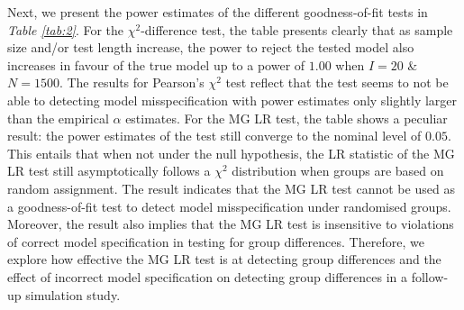 \documentclass[Royal,sageapa,times,doublespace]{sagej}
\begin{document}
\indent Next, we present the power estimates of the different goodness-of-fit tests in \textit{Table \ref{tab:2}}. For the $\chi^2$-difference test, the table presents clearly that as sample size and/or test length increase, the power to reject the tested model also increases in favour of the true model up to a power of $1.00$ when $I = 20$ \& $N = 1500$. The results for Pearson's $\chi^2$ test reflect that the test seems to not be able to detecting model misspecification with power estimates only slightly larger than the empirical $\alpha$ estimates. For the MG LR test, the table shows a peculiar result: the power estimates of the test still converge to the nominal level of $0.05$. This entails that when not under the null hypothesis, the LR statistic of the MG LR test still asymptotically follows a $\chi^2$ distribution when groups are based on random assignment. The result indicates that the MG LR test cannot be used as a goodness-of-fit test to detect model misspecification under randomised groups. Moreover, the result also implies that the MG LR test is insensitive to violations of correct model specification in testing for group differences. Therefore, we explore how effective the MG LR test is at detecting group differences and the effect of incorrect model specification on detecting group differences in a follow-up simulation study. \\
\end{document}
